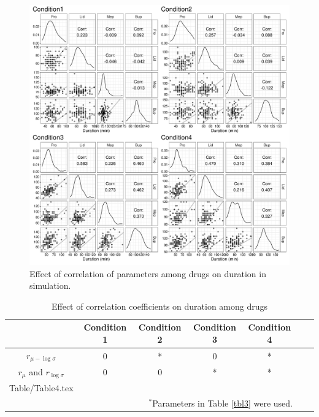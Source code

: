 \documentclass[a4paper,11pt]{article}
\makeatletter
\newcommand*\ExpandableInput[1]{\@@input#1 }
\makeatother
\begin{document}
\begin{figure}[htbp]
 \centering
 \includegraphics[width=1\textwidth]{Fig/Fig5.pdf}
 \caption{Effect of correlation of parameters among drugs on duration in simulation.}
 \label{fig5}
\end{figure}

\clearpage



\begin{table}[htbp]
 \caption{Effect of correlation coefficients on duration among drugs}
 \label{tbl4}
 \small
 \vspace{1ex}
 \centering
 \begin{tabular}{ccccccc}
  \toprule
  & Condition 1 & Condition 2 & Condition 3 & Condition 4 \\
  \midrule
  $r_{\mu - \log \sigma}$         & 0 & * & 0 & * \\
  $r_{\mu}$ and $r_{\log \sigma}$ & 0 & 0 & * & * \\
  \ExpandableInput{Table/Table4.tex}

  \\[-2ex]
  \multicolumn{5}{r}{$^\text{*}$Parameters in Table \ref{tbl3} were used.} \\
 \end{tabular}
\end{table}
\end{document}
